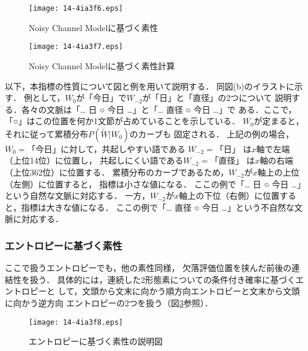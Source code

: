 \documentclass[japanese]{jnlp_1.3e}
\begin{document}
\begin{figure}[b]
\begin{center}
    \texttt{[image: 14-4ia3f6.eps]}
  \end{center}
  \caption{Noisy Channel Modelに基づく素性}
  \label{fig:noisy}
\end{figure}

\begin{figure}[t]
\begin{center}
    \texttt{[image: 14-4ia3f7.eps]}
  \end{center}
  \caption{Noisy Channel Modelに基づく素性計算}
  \label{fig:素性3}
\end{figure}

以下，本指標の性質について図と例を用いて説明する．
同図(b)のイラストに示す．
例として，$W_0$が「今日」で$W_{-2}$が「日」と「直径」の2つについて
説明する．各々の文脈は「… 日 ○ 今日 …」と「… 直径 ○ 今日 …」で
ある．ここで，「○」はこの位置を何か1文節が占めていることを示している．
$W_0$が定まると，それに従って累積分布$P(\tilde W \vert W_0)$のカーブも
固定される．
上記の例の場合，$W_0 = 「今日」$に対して，共起しやすい語である
$W_{-2} = 「日」$ は$x$軸で左端（上位14位）に位置し，
共起しにくい語である$W_{-2} = 「直径」$ は$x$軸の右端（上位362位）に位置する．
累積分布のカーブであるため，$W_{-2}$が$x$軸上の上位（左側）に位置すると，
指標は小さな値になる．
ここの例で「… 日 ○ 今日 …」という自然な文脈に対応する．
一方，$W_{-2}$が$x$軸上の下位（右側）に位置すると，指標は大きな値になる．
ここの例で「… 直径 ○ 今日 …」という不自然な文脈に対応する．



\subsubsection{エントロピーに基づく素性} 

ここで扱うエントロピーでも，他の素性同様，
欠落評価位置を挟んだ前後の連結性を扱う．
具体的には，連続した2形態素についての条件付き確率に基づくエントロピーと
して，文頭から文末に向かう順方向エントロピーと文末から文頭に向かう逆方向
エントロピーの2つを扱う（図\ref{fig:素性4}参照）．

\begin{figure}[t]
    \texttt{[image: 14-4ia3f8.eps]}
  \caption{エントロピーに基づく素性の説明図}
  \label{fig:素性4}
\end{figure}
\end{document}
